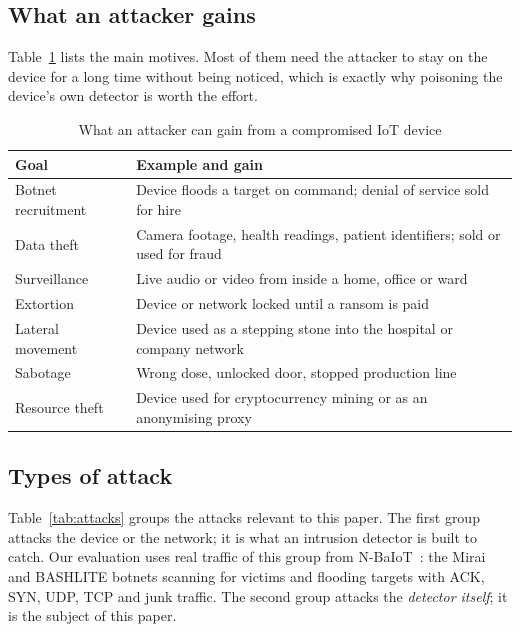 \subsection{What an attacker gains}
Table~\ref{tab:gains} lists the main motives. Most of them need the attacker to stay on the device for a
long time without being noticed, which is exactly why poisoning the device's own detector is worth the
effort.

\begin{table}[t]
\caption{What an attacker can gain from a compromised IoT device}\label{tab:gains}
\centering\footnotesize
\begin{tabular}{@{}p{2.1cm}p{5.9cm}@{}}
\toprule
Goal & Example and gain \\
\midrule
Botnet recruitment & Device floods a target on command; denial of service sold for hire \\
Data theft & Camera footage, health readings, patient identifiers; sold or used for fraud \\
Surveillance & Live audio or video from inside a home, office or ward \\
Extortion & Device or network locked until a ransom is paid \\
Lateral movement & Device used as a stepping stone into the hospital or company network \\
Sabotage & Wrong dose, unlocked door, stopped production line \\
Resource theft & Device used for cryptocurrency mining or as an anonymising proxy \\
\bottomrule
\end{tabular}
\end{table}

\subsection{Types of attack}
Table~\ref{tab:attacks} groups the attacks relevant to this paper. The first group attacks the device or
the network; it is what an intrusion detector is built to catch. Our evaluation uses real traffic of this
group from N-BaIoT~\cite{nbaiot}: the Mirai and BASHLITE botnets scanning for victims and flooding
targets with ACK, SYN, UDP, TCP and junk traffic. The second group attacks the \emph{detector itself}; it
is the subject of this paper.

